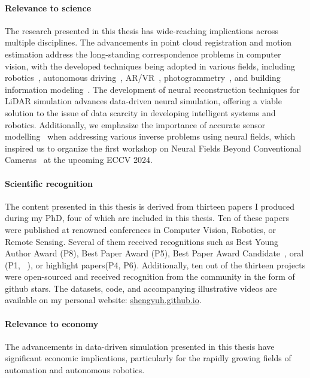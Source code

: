 \paragraph{Relevance to science}
The research presented in this thesis has wide-reaching implications across multiple disciplines. The advancements in point cloud registration and motion estimation address the long-standing correspondence problems in computer vision, with the developed techniques being adopted in various fields, including robotics~\cite{wen2024foundationpose}, autonomous driving~\cite{seidenschwarz2024semoli}, AR/VR~\cite{Zhao_2023_ICCV}, photogrammetry~\cite{xu2023point_isprs}, and building information modeling~\cite{rashdi2022scanning}. The development of neural reconstruction techniques for LiDAR simulation advances data-driven neural simulation, offering a viable solution to the issue of data scarcity in developing intelligent systems and robotics. Additionally, we emphasize the importance of accurate sensor modelling~\cite{ehret2024radar,klinghoffer2024platonerf} when addressing various inverse problems using neural fields, which inspired us to organize the first workshop on Neural Fields Beyond Conventional Cameras~\cite{nfcc} at the upcoming ECCV 2024.


\paragraph{Scientific recognition}
The content presented in this thesis is derived from thirteen papers I produced during my PhD, four of which are included in this thesis. Ten of these papers were published at renowned conferences in Computer Vision, Robotics, or Remote Sensing. Several of them received recognitions such as Best Young Author Award (P8), Best Paper Award (P5), Best Paper Award Candidate~\cite{ke2023marigold}, oral (P1, ~\cite{ke2023marigold}), or highlight papers(P4, P6). Additionally, ten out of the thirteen projects were open-sourced and received recognition from the community in the form of github stars. The datasets, code, and accompanying illustrative videos are available on my personal website: \url{shengyuh.github.io}.

\paragraph{Relevance to economy}
The advancements in data-driven simulation presented in this thesis have significant economic implications, particularly for the rapidly growing fields of automation and autonomous robotics.

